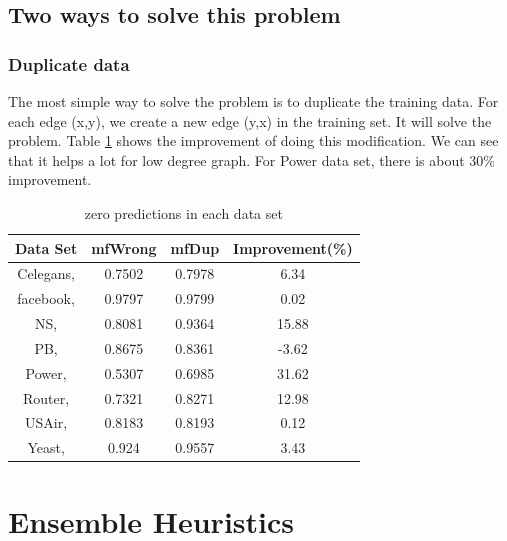 \documentclass[12pt]{article}
\begin{document}
\subsection{Two ways to solve this problem}

\subsubsection{Duplicate data}
The most simple way to solve the problem is to duplicate the training data. For each edge (x,y), we create a new edge (y,x) in the training set. It will solve the problem. Table \ref{tab:dup} shows the improvement of doing this modification. We can see that it helps a lot for low degree graph. For Power data set, there is about 30\% improvement. 

\begin{table}
	\begin{center}
		\begin{tabular}{|c|c|c|c|}
			\hline
			Data Set & mfWrong & mfDup & Improvement(\%) \\
			\hline
			Celegans,&0.7502&0.7978&6.34\\
			facebook,&0.9797&0.9799&0.02\\
			NS,&0.8081&0.9364&15.88\\
			PB,&0.8675&0.8361&-3.62\\
			Power,&0.5307&0.6985&31.62\\
			Router,&0.7321&0.8271&12.98\\
			USAir,&0.8183&0.8193&0.12\\
			Yeast,&0.924&0.9557&3.43\\
			\hline
		\end{tabular}
	\end{center}
	\caption{zero predictions in each data set}
	\label{tab:dup}
\end{table}

\section{Ensemble Heuristics}





	
	
\end{document}
